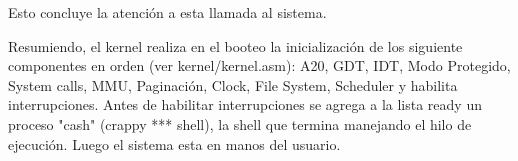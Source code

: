Esto concluye la atención a esta llamada al sistema.

Resumiendo, el kernel realiza en el booteo la inicialización de los siguiente
componentes en orden (ver kernel/kernel.asm): A20, GDT, IDT, Modo Protegido,
System calls, MMU, Paginación, Clock, File System, Scheduler y habilita
interrupciones. Antes de habilitar interrupciones se agrega a la lista ready un
proceso "cash" (crappy *** shell), la shell que termina manejando el hilo de
ejecución. Luego el sistema esta en manos del usuario.
